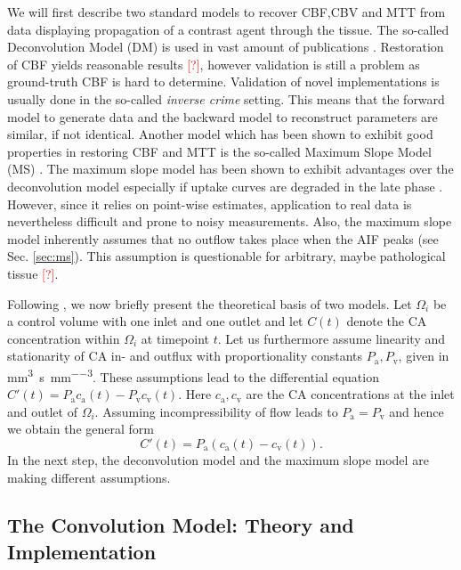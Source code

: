 \documentclass[paper=a4, fontsize=11pt,parskip=half,headings=small]{scrartcl}
\newcommand{\ca}{c_\mathrm{a}}
\newcommand{\cout}{c_{\mathrm{v}}}
\newcommand{\Pa}{P_{\mathrm{a}}}
\newcommand{\Pout}{P_{\mathrm{v}}}
\newcommand{\siP}{\cubic\milli\meter\per\second\per\cubic\milli\meter}
\newcommand{\missingsource}{\textcolor{red}{[?]}}
\begin{document}
	We will first describe two standard models to recover CBF,CBV and MTT from data displaying propagation of a contrast agent through the tissue.
	The so-called Deconvolution Model (DM) is used in vast amount of publications \cite{ostergaard96,abels10,straka10,bivard13,sourbron13}.
	Restoration of CBF yields reasonable results \missingsource, however validation is still a problem as ground-truth CBF is hard to determine.
	Validation of novel implementations is usually done in the so-called \emph{inverse crime} setting. 
	This means that the forward model to generate data and the backward model to reconstruct parameters are similar, if not identical.
	Another model which has been shown to exhibit good properties in restoring CBF and MTT is the so-called Maximum Slope Model (MS) \cite{miles91,klotz99}.
	The maximum slope model has been shown to exhibit advantages over the deconvolution model especially if uptake curves are degraded in the late phase \cite{abels10}.
	However, since it relies on point-wise estimates, application to real data is nevertheless difficult and prone to noisy measurements.
	Also, the maximum slope model inherently assumes that no outflow takes place when the AIF peaks (see Sec. \ref{sec:ms}).
	This assumption is questionable for arbitrary, maybe pathological tissue \missingsource.
	
		
	Following \cite{sourbron13}, we now briefly present the theoretical basis of two models.
	Let $\Omega_i$ be a control volume with one inlet and one outlet and let $C(t)$ denote the CA concentration within $\Omega_i$ at timepoint $t$.
	Let us furthermore assume linearity and stationarity of CA in- and outflux with proportionality constants $\Pa,\Pout$, given in \si{\siP}.
	These assumptions lead to the differential equation $C'(t) = \Pa\ca(t) - \Pout\cout(t)$.
	Here $\ca,\cout$ are the CA concentrations at the inlet and outlet of $\Omega_i$.
	Assuming incompressibility of flow leads to $\Pa = \Pout$ and hence we obtain the general form
	\begin{equation}
		C'(t) = \Pa\left(\ca(t) - \cout(t)\right).
		\label{eq:classicgeneral}
	\end{equation}
	In the next step, the deconvolution model and the maximum slope model are making different assumptions.

	\subsection{The Convolution Model: Theory and Implementation}\label{sec:conv}
	
\end{document}
